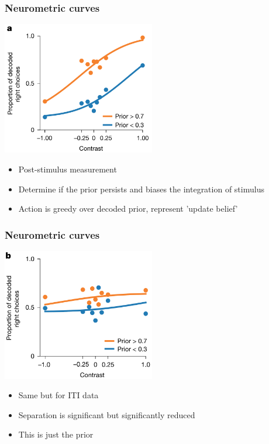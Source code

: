 \documentclass{beamer}
\begin{document}
\begin{frame}
  \frametitle{Neurometric curves}
  \begin{center}
    \includegraphics[width=0.5\textwidth, keepaspectratio]{./figure3a}
  \end{center}
  \begin{itemize}
    \item Post-stimulus measurement
    \item Determine if the prior persists and biases the integration of stimulus
    \item Action is greedy over decoded prior, represent 'update belief'
  \end{itemize}
\end{frame}

\begin{frame}
  \frametitle{Neurometric curves}
  \begin{center}
    \includegraphics[width=0.5\textwidth, keepaspectratio]{./figure3b}
  \end{center}
  \begin{itemize}
    \item Same but for ITI data
    \item Separation is significant but significantly reduced
    \item This is just the prior
  \end{itemize}
\end{frame}
\end{document}
